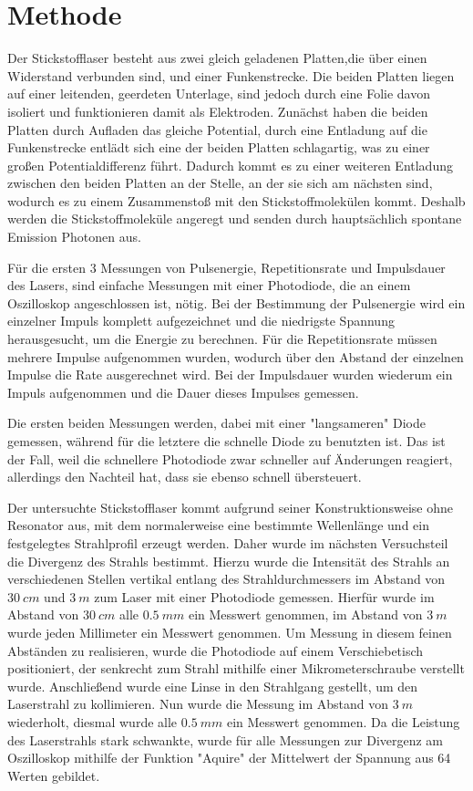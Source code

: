 \documentclass[
	a4paper,
	12pt,
	pagesize,
	ngerman
]{scrartcl}
\begin{document}
\section{Methode}
Der Stickstofflaser besteht aus zwei gleich geladenen Platten,die über einen Widerstand verbunden sind, und einer Funkenstrecke. Die beiden Platten liegen auf einer leitenden, geerdeten Unterlage, sind jedoch durch eine Folie davon isoliert und funktionieren damit als Elektroden. Zunächst haben die beiden Platten durch Aufladen das gleiche Potential, durch eine Entladung auf die Funkenstrecke entlädt sich eine der beiden Platten schlagartig, was zu einer großen Potentialdifferenz führt. Dadurch kommt es zu einer weiteren Entladung zwischen den beiden Platten an der Stelle, an der sie sich am nächsten sind, wodurch es zu einem Zusammenstoß mit den Stickstoffmolekülen kommt. Deshalb werden die Stickstoffmoleküle angeregt und senden durch hauptsächlich spontane Emission Photonen aus. %

Für die ersten 3 Messungen von Pulsenergie, Repetitionsrate und Impulsdauer des Lasers, sind einfache Messungen mit einer Photodiode, die an einem Oszilloskop angeschlossen ist, nötig.
Bei der Bestimmung der Pulsenergie wird ein einzelner Impuls komplett aufgezeichnet und die niedrigste Spannung herausgesucht, um die Energie zu berechnen. 
Für die Repetitionsrate müssen mehrere Impulse aufgenommen wurden, wodurch über den Abstand der einzelnen Impulse die Rate ausgerechnet wird.
Bei der Impulsdauer wurden wiederum ein Impuls aufgenommen und die Dauer dieses Impulses gemessen.

Die ersten beiden Messungen werden, dabei mit einer "langsameren" Diode gemessen, während für die letztere die schnelle Diode zu benutzten ist. Das ist der Fall, weil die schnellere Photodiode zwar schneller auf Änderungen reagiert, allerdings den Nachteil hat, dass sie ebenso schnell übersteuert.

Der untersuchte Stickstofflaser kommt aufgrund seiner Konstruktionsweise ohne Resonator aus, mit dem normalerweise eine bestimmte Wellenlänge und ein festgelegtes Strahlprofil erzeugt werden. Daher wurde im nächsten Versuchsteil die Divergenz des Strahls bestimmt. Hierzu wurde die Intensität des Strahls an verschiedenen Stellen vertikal entlang des Strahldurchmessers im Abstand von $\SI{30}{cm}$ und $\SI{3}{m}$ zum Laser mit einer Photodiode gemessen. Hierfür wurde im Abstand von $\SI{30}{cm}$ alle $\SI{0,5}{mm}$ ein Messwert genommen, im Abstand von $\SI{3}{m}$ wurde jeden Millimeter ein Messwert genommen. Um Messung in diesem feinen Abständen zu realisieren, wurde die Photodiode auf einem Verschiebetisch positioniert, der senkrecht zum Strahl mithilfe einer Mikrometerschraube verstellt wurde.
Anschließend wurde eine Linse in den Strahlgang gestellt, um den Laserstrahl zu kollimieren. Nun wurde die Messung im Abstand von $\SI{3}{m}$ wiederholt, diesmal wurde alle $\SI{0,5}{mm}$ ein Messwert genommen. Da die Leistung des Laserstrahls stark schwankte, wurde für alle Messungen zur Divergenz am Oszilloskop mithilfe der Funktion "Aquire" der Mittelwert der Spannung aus 64 Werten gebildet.
\end{document}
